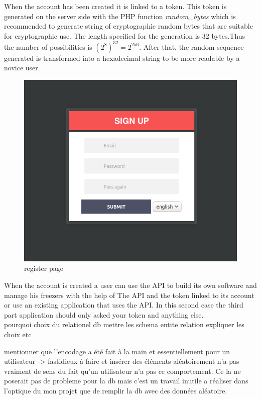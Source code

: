 When the account has been created it is linked to a token. This token is generated on the server side with the PHP function \textit{random\_bytes} which is recommended to generate string of cryptographic random bytes that are suitable for cryptographic use. The length  specified for the generation is 32 bytes.Thus the number of possibilities is $(2^8)^{32} = 2^{256}$. After that, the random sequence generated is transformed into a hexadecimal string to be more readable by a novice user.\\
\begin{figure}[H]
\centering
\includegraphics[scale=0.4]{./images/register.png}
\caption{register page}
\label{fig:register}
\end{figure}

When the account is created a user can use the API to build its own software and manage his freezers with the help of The API and the token linked to its account or use an existing application that uses the API. In this second case the third part application should only asked your token and anything else.\\

pourquoi choix du relationel db
mettre les schema entite relation expliquer les choix etc

 mentionner que l'encodage a été fait à la main et essentiellement pour un utilisateur -> fastidieux à faire et insérer des éléments aléatoirement n'a pas vraiment de sens du fait qu'un utilisateur n'a pas ce comportement. Ce la ne poserait pas de probleme pour la db mais c'est un travail inutile a réaliser dans l'optique du mon projet que de remplir la db avec des données aléatoire.

